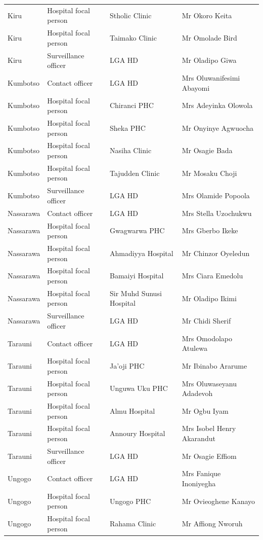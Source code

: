 \documentclass[a4paper, titlepage]{tufte-handout}
\begin{document}
\begin{table}
\begin{tabular}{l|l|l|l}
Kiru & Hospital focal person & Stholic Clinic & Mr Okoro Keita\\
Kiru & Hospital focal person & Taimako Clinic & Mr Omolade Bird\\
Kiru & Surveillance officer & LGA HD & Mr Oladipo Giwa\\
Kumbotso & Contact officer & LGA HD & Mrs Oluwanifesimi Abayomi\\
Kumbotso & Hospital focal person & Chiranci PHC & Mrs Adeyinka Olowola\\
Kumbotso & Hospital focal person & Sheka PHC & Mr Onyinye Agwuocha\\
Kumbotso & Hospital focal person & Nasiha Clinic & Mr Osagie Bada\\
Kumbotso & Hospital focal person & Tajudden Clinic & Mr Mosaku Choji\\
Kumbotso & Surveillance officer & LGA HD & Mrs Olamide Popoola\\
Nassarawa & Contact officer & LGA HD & Mrs Stella Uzochukwu\\
Nassarawa & Hospital focal person & Gwagwarwa PHC & Mrs Gberbo Ikeke\\
Nassarawa & Hospital focal person & Ahmadiyya Hospital & Mr Chinzor Oyeledun\\
Nassarawa & Hospital focal person & Bamaiyi Hospital & Mrs Ciara Emedolu\\
Nassarawa & Hospital focal person & Sir Muhd Sunusi Hospital & Mr Oladipo Ikimi\\
Nassarawa & Surveillance officer & LGA HD & Mr Chidi Sherif\\
Tarauni & Contact officer & LGA HD & Mrs Omodolapo Atulewa\\
Tarauni & Hospital focal person & Ja'oji PHC & Mr Ibinabo Ararume\\
Tarauni & Hospital focal person & Unguwa Uku PHC & Mrs Oluwaseyanu Adadevoh\\
Tarauni & Hospital focal person & Almu Hospital & Mr Ogbu Iyam\\
Tarauni & Hospital focal person & Annoury Hospital & Mrs Isobel Henry Akarandut\\
Tarauni & Surveillance officer & LGA HD & Mr Osagie Effiom\\
Ungogo & Contact officer & LGA HD & Mrs Fanique Inoniyegha\\
Ungogo & Hospital focal person & Ungogo PHC & Mr Ovieoghene Kanayo\\
Ungogo & Hospital focal person & Rahama Clinic & Mr Affiong Nworuh\\

\end{tabular}
\end{table}
\end{document}
